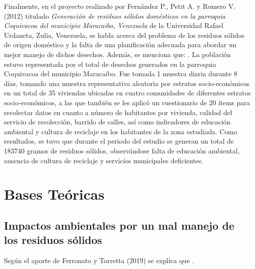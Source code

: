 Finalmente, en el proyecto realizado por Fernández P., Petit A. y Romero V. (2012) titulado \textit{Generación de residuos sólidos domésticos en la parroquia Coquivacoa del municipio Maracaibo, Venezuela} de la Universidad Rafael Urdaneta, Zulia, Venezuela, se habla acerca del problema de los residuos sólidos de origen doméstico y la falta de una planificación adecuada para abordar un mejor manejo de dichos desechos. Además, se menciona que: . La población estuvo representada por el total de desechos generados en la parroquia Coquivacoa del municipio Maracaibo. Fue tomada 1 muestra diaria durante 8 días, tomando una muestra representativa aleatoria por estratos socio-económicos en un total de 35 viviendas ubicadas en cuatro comunidades de diferentes estratos socio-económicos, a las que también se les aplicó un cuestionario de 20 ítems para recolectar datos en cuanto a número de habitantes por vivienda, calidad del servicio de recolección, barrido de calles, así como indicadores de educación ambiental y cultura de reciclaje en los habitantes de la zona estudiada. Como resultados, se tuvo que durante el periodo del estudio se generan un total de 183740 gramos de residuos sólidos, observándose falta de educación ambiental, ausencia de cultura de reciclaje y servicios municipales deficientes.

\newpage

\section{Bases Teóricas}

\subsection{Impactos ambientales por un mal manejo de los residuos sólidos}

Según el aporte de Ferronato y Torretta (2019) se explica que .

